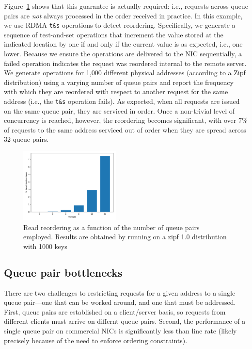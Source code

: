 Figure~\ref{fig:reorder} shows that this guarantee is actually
required: i.e., requests across queue pairs are \emph{not} always
processed in the order received in practice.  In this example, we use
RDMA \texttt{t\&s} operations to detect reordering.  Specifically, we
generate a sequence of test-and-set operations that increment the
value stored at the indicated location by one if and only if the
current value is as expected, i.e., one lower.  Because we ensure the
operations are delivered to the NIC sequentially, a failed operation
indicates the request was reordered internal to the remote server.  We
generate operations for 1,000 different physical addresses (according
to a Zipf distribution) using a varying number of queue pairs and report
the frequency with which they are reordered with respect to another
request for the same address (i.e., the \texttt{t\&s} operation
fails).  As expected, when all requests
are issued on the same queue pair, they are serviced in order.  Once a
non-trivial level of concurrency is reached, however, the reordering
becomes significant, with over 7\% of requests to the same address
serviced out of order when they are spread across 32 queue pairs.

\begin{figure}[t]
    \includegraphics[width=0.45\textwidth]{fig/read_reordering.pdf}
    \caption{Read reordering as a function of the number of queue pairs employed. Results are obtained by running on a zipf 1.0 distribution with 1000 keys}
    \label{fig:reorder}
\end{figure}

\subsection{Queue pair bottlenecks}

 There are two challenges to restricting requests for a given address
 to a single queue pair---one that can be worked around, and one that
 must be addressed.  First, queue pairs are established on a
 client/server basis, so requests from different clients must arrive
 on differnt queue pairs.  Second, the performance of a single queue
 pair on commercial NICs is significantly less than line rate (likely
 precisely because of the need to enforce ordering constraints).

